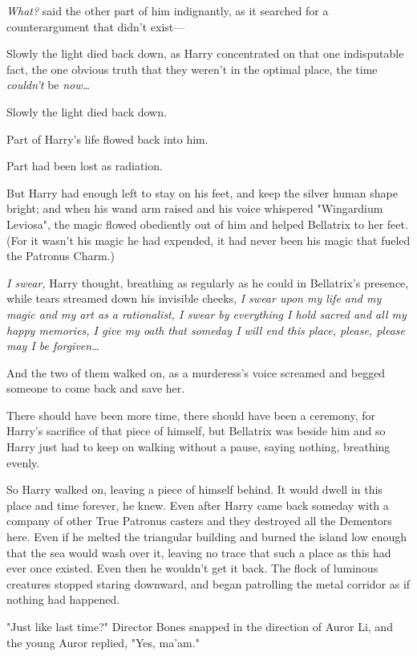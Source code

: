 \emph{What?} said the other part of him indignantly, as it searched for a 
counterargument that didn't exist---

Slowly the light died back down, as Harry concentrated on that one indisputable 
fact, the one obvious truth that they weren't in the optimal place, the time 
\emph{couldn't} be \emph{now{\ldots}}

Slowly the light died back down.

Part of Harry's life flowed back into him.

Part had been lost as radiation.

But Harry had enough left to stay on his feet, and keep the silver human shape 
bright; and when his wand arm raised and his voice whispered "Wingardium 
Leviosa", the magic flowed obediently out of him and helped Bellatrix to her 
feet. (For it wasn't his magic he had expended, it had never been his magic 
that fueled the Patronus Charm.)

\emph{I swear,} Harry thought, breathing as regularly as he could in 
Bellatrix's presence, while tears streamed down his invisible cheeks, \emph{I 
swear upon my life and my magic and my art as a rationalist, I swear by 
everything I hold sacred and all my happy memories, I give my oath that someday 
I will end this place, please, please may I be forgiven{\ldots}}

And the two of them walked on, as a murderess's voice screamed and begged 
someone to come back and save her.

There should have been more time, there should have been a ceremony, for 
Harry's sacrifice of that piece of himself, but Bellatrix was beside him and so 
Harry just had to keep on walking without a pause, saying nothing, breathing 
evenly.

So Harry walked on, leaving a piece of himself behind. It would dwell in this 
place and time forever, he knew. Even after Harry came back someday with a 
company of other True Patronus casters and they destroyed all the Dementors 
here. Even if he melted the triangular building and burned the island low 
enough that the sea would wash over it, leaving no trace that such a place as 
this had ever once existed. Even then he wouldn't get it back.
\sbreak
The flock of luminous creatures stopped staring downward, and began patrolling 
the metal corridor as if nothing had happened.

"Just like last time?" Director Bones snapped in the direction of Auror Li, and 
the young Auror replied, "Yes, ma'am."

